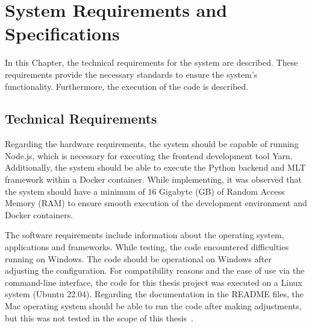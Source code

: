 \documentclass[../MasterThesis.tex]{subfiles}
\begin{document}
	
	
	

%
%
%
%
%
%
%
%
\newpage
\section{System Requirements and Specifications} \label{section:systemrequirementsandspecifications}




In this Chapter, the technical requirements for the system are described. These requirements provide the necessary standards to ensure the system's functionality. Furthermore, the execution of the code is described.




\subsection{Technical Requirements} \label{subsection:technicalrequirements}



Regarding the hardware requirements, the system should be capable of running Node.js, which is necessary for executing the frontend development tool Yarn. Additionally, the system should be able to execute the Python backend and MLT framework within a Docker container.
While implementing, it was observed that the system should have a minimum of $16$ Gigabyte (GB) of Random Access Memory (RAM) to ensure smooth execution of the development environment and Docker containers.



The software requirements include information about the operating system, applications and frameworks.
While testing, the code encountered difficulties running on Windows.
The code should be operational on Windows after adjusting the configuration.
For compatibility reasons and the ease of use via the command-line interface, the code for this thesis project was executed on a Linux system (Ubuntu 22.04).  
Regarding the documentation in the README files, the Mac operating system should be able to run the code after making adjustments, but this was not tested in the scope of this thesis~\cite{RM_Backend}.
\end{document}
